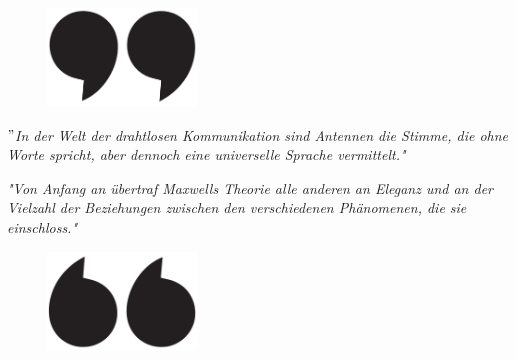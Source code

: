 \vspace*{4cm}

\begin{figure}[H]
	\includegraphics[width=4cm, left]{figures/upper-quote-marks.png}
\end{figure}

\textit{$"$In der Welt der drahtlosen Kommunikation sind Antennen die Stimme, die ohne Worte spricht, aber dennoch eine universelle Sprache vermittelt."} \\

\vspace{2cm}

\textit{"Von Anfang an übertraf Maxwells Theorie alle anderen an Eleganz und an der Vielzahl der Beziehungen zwischen den verschiedenen Phänomenen, die sie einschloss."}\\

\vspace{1cm}

\begin{figure}[H]
	\includegraphics[width=4cm, right]{figures/lower-quote-marks.png}
\end{figure}




